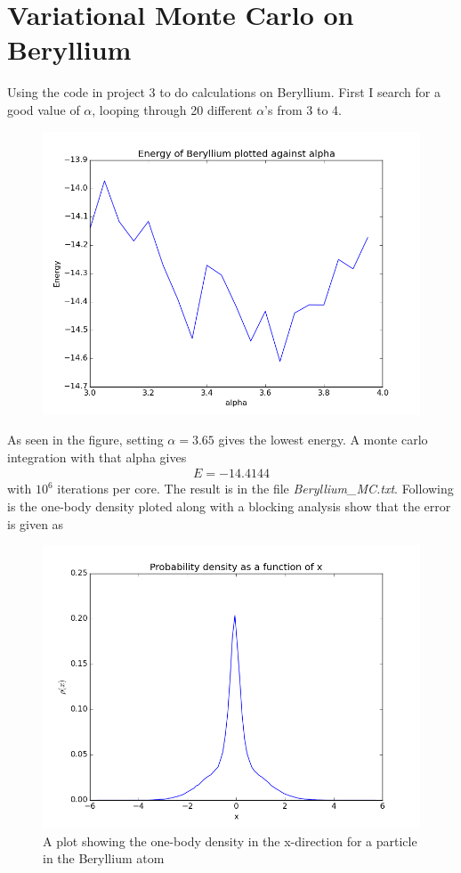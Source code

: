 \documentclass[a4paper, 12pt, titlepage]{article}
\begin{document}
\section*{Variational Monte Carlo on Beryllium}
 Using the code in project 3 to do calculations on Beryllium. First I search for a good value of $\alpha$, looping through 20 different $\alpha$'s from 3 to 4.
 \begin{figure}
 	\centering
 	\includegraphics[width=\textwidth]{../python_programs/FindOptimalAlphaBeryllium.png}
 \end{figure}
 As seen in the figure, setting $\alpha = 3.65$ gives the lowest energy. A monte carlo integration with that alpha gives 
 \begin{align*}
 	E = -14.4144
 \end{align*}
 with $10^6$ iterations per core. The result is in the file \textit{Beryllium\_MC.txt}. Following is the one-body density ploted along with a blocking analysis show that the error is given as 
 \begin{figure}
 	\centering
 	\includegraphics[width=\textwidth]{../python_programs/ProbabilityDensityBeryllium.png}
 	\caption{A plot showing the one-body density in the x-direction for a particle in the Beryllium atom}
 \end{figure}
\end{document}
